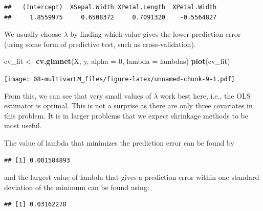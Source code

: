 \documentclass[
]{book}
\newenvironment{Shaded}{\begin{snugshade}}{\end{snugshade}}
\newcommand{\AttributeTok}[1]{\textcolor[rgb]{0.13,0.29,0.53}{#1}}
\newcommand{\DecValTok}[1]{\textcolor[rgb]{0.00,0.00,0.81}{#1}}
\newcommand{\FloatTok}[1]{\textcolor[rgb]{0.00,0.00,0.81}{#1}}
\newcommand{\FunctionTok}[1]{\textcolor[rgb]{0.13,0.29,0.53}{\textbf{#1}}}
\newcommand{\NormalTok}[1]{#1}
\newcommand{\OtherTok}[1]{\textcolor[rgb]{0.56,0.35,0.01}{#1}}
\newcommand{\SpecialCharTok}[1]{\textcolor[rgb]{0.81,0.36,0.00}{\textbf{#1}}}
\theoremstyle{definition}
\theoremstyle{definition}
\theoremstyle{definition}
\theoremstyle{definition}
\theoremstyle{remark}
\begin{document}
\begin{verbatim}
##   (Intercept)  XSepal.Width XPetal.Length  XPetal.Width 
##     1.8559975     0.6508372     0.7091320    -0.5564827
\end{verbatim}

We usually choose \(\lambda\) by finding which value gives the lower prediction error (using some form of predictive test, such as cross-validation).

\begin{Shaded}
\begin{Highlighting}[]
\NormalTok{cv\_fit }\OtherTok{\textless{}{-}} \FunctionTok{cv.glmnet}\NormalTok{(X, y, }\AttributeTok{alpha =} \DecValTok{0}\NormalTok{, }\AttributeTok{lambda =}\NormalTok{ lambdas)}
\FunctionTok{plot}\NormalTok{(cv\_fit)}
\end{Highlighting}
\end{Shaded}

\texttt{[image: 08-multivarLM\_files/figure-latex/unnamed-chunk-9-1.pdf]}

From this, we can see that very small values of \(\lambda\) work best here, i.e., the OLS estimator is optimal. This is not a surprise as there are only three covariates in this problem. It is in larger problems that we expect shrinkage methods to be most useful.

The value of lambda that minimizes the prediction error can be found by

\begin{Shaded}
\end{Shaded}

\begin{verbatim}
## [1] 0.001584893
\end{verbatim}

and the largest value of lambda that gives a prediction error within one standard deviation of the minimum can be found using:

\begin{Shaded}
\end{Shaded}

\begin{verbatim}
## [1] 0.03162278
\end{verbatim}
\end{document}

